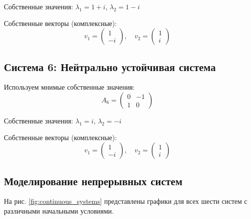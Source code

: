 Собственные значения: $\lambda_1 = 1 + i$, $\lambda_2 = 1 - i$

Собственные векторы (комплексные):
\begin{equation}
v_1 = \begin{pmatrix} 1 \\ -i \end{pmatrix}, \quad v_2 = \begin{pmatrix} 1 \\ i \end{pmatrix}
\end{equation}

\subsection{Система 6: Нейтрально устойчивая система}

Используем мнимые собственные значения:
\begin{equation}
A_6 = \begin{pmatrix} 0 & -1 \\ 1 & 0 \end{pmatrix}
\end{equation}

Собственные значения: $\lambda_1 = i$, $\lambda_2 = -i$

Собственные векторы (комплексные):
\begin{equation}
v_1 = \begin{pmatrix} 1 \\ -i \end{pmatrix}, \quad v_2 = \begin{pmatrix} 1 \\ i \end{pmatrix}
\end{equation}

\subsection{Моделирование непрерывных систем}

На рис. \ref{fig:continuous_systems} представлены графики для всех шести систем с различными начальными условиями.


